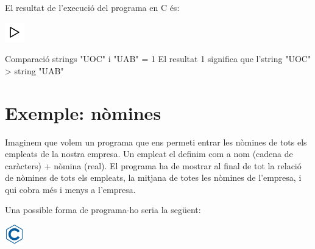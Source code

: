 \documentclass[]{book}
\newenvironment{Shaded}{\begin{snugshade}}{\end{snugshade}}
\newcommand{\DecValTok}[1]{\textcolor[rgb]{0.00,0.00,0.81}{#1}}
\newcommand{\StringTok}[1]{\textcolor[rgb]{0.31,0.60,0.02}{#1}}
\newcommand{\NormalTok}[1]{#1}
\begin{document}
El resultat de l'execució del programa en C és:

\includegraphics{./img/play.png}

\begin{Shaded}
\begin{Highlighting}[]
\NormalTok{Comparació strings }\StringTok{"UOC"}\NormalTok{ i }\StringTok{"UAB"}\NormalTok{ = }\DecValTok{1}
\NormalTok{El resultat }\DecValTok{1}\NormalTok{ significa que l'string }\StringTok{"UOC"}\NormalTok{ > string }\StringTok{"UAB"}
\end{Highlighting}
\end{Shaded}

\section{Exemple: nòmines}\label{exemple-nomines}

Imaginem que volem un programa que ens permeti entrar les nòmines de
tots els empleats de la nostra empresa. Un empleat el definim com a nom
(cadena de caràcters) + nòmina (real). El programa ha de mostrar al
final de tot la relació de nòmines de tots els empleats, la mitjana de
totes les nòmines de l'empresa, i qui cobra més i menys a l'empresa.

Una possible forma de programa-ho seria la següent:

\includegraphics{./img/c.png}
\end{document}
